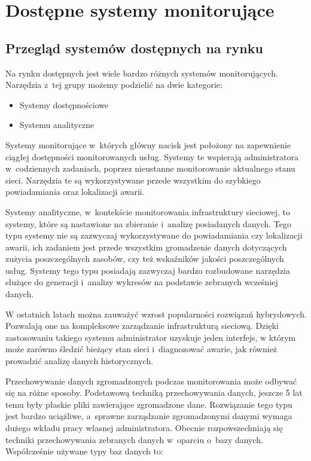 \chapter{Dostępne systemy monitorujące}
\label{chap:Systemy}

\section[Przegląd systemów][Przegląd systemów dostępnych na rynku]{Przegląd systemów dostępnych na rynku}

Na rynku dostępnych jest wiele bardzo różnych systemów
monitorujących. Narzędzia z~tej grupy możemy podzielić na dwie
kategorie:

\begin{itemize}
\item Systemy dostępnościowe
\item Systemu analityczne
\end{itemize}

Systemy monitorujące w~których główny nacisk jest położony na
zapewnienie ciągłej dostępności monitorowanych usług. Systemy te
wspierają administratora w~codziennych zadaniach, poprzez nieustanne
monitorowanie aktualnego stanu sieci. Narzędzia te są wykorzystywane
przede wszystkim do szybkiego powiadamiania oraz lokalizacji awarii.

Systemy analityczne, w~kontekście monitorowania infrastruktury
sieciowej, to systemy, które są nastawione na zbieranie i~analizę
posiadanych danych. Tego typu systemy nie są zazwyczaj wykorzystywane
do powiadamiania czy lokalizacji awarii, ich zadaniem jest
przede wszystkim gromadzenie danych dotyczących zużycia poszczególnych
zasobów, czy też wskaźników jakości poszczególnych usług. Systemy tego
typu posiadają zazwyczaj bardzo rozbudowane narzędzia służące do
generacji i~analizy wykresów na podstawie zebranych wcześniej danych.

W ostatnich latach można zauważyć wzrost popularności rozwiązań
hybrydowych. Pozwalają one na kompleksowe zarządzanie infrastrukturą
sieciową. Dzięki zastosowaniu takiego systemu administrator uzyskuje
jeden interfejs, w którym może zarówno śledzić bieżący stan sieci
i~diagnozować awarie, jak również prowadzić analizę danych
historycznych.

Przechowywanie danych zgromadzonych podczas monitorowania może odbywać
się na różne sposoby. Podstawową techniką przechowywania danych,
jeszcze 5 lat temu były płaskie pliki zawierające zgromadzone
dane. Rozwiązanie tego typu jest bardzo uciążliwe, a~sprawne
zarządzanie zgromadzonymi danymi wymaga dużego wkładu pracy własnej
administratora. Obecnie rozpowszechniają się techniki przechowywania
zebranych danych w~oparciu o~bazy danych. Współcześnie używane typy baz danych to:

